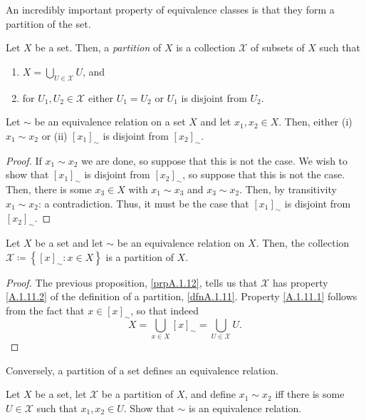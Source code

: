 An incredibly important property of equivalence classes is that they form a partition of the set.
\begin{dfn}[Partition]\label{dfnA.1.11}
Let $X$ be a set.  Then, a \emph{partition} of $X$ is a collection $\mathcal{X}$ of subsets of $X$ such that
\begin{enumerate}
\item \label{A.1.11.1}$X=\bigcup _{U\in \mathcal{X}}U$, and
\item \label{A.1.11.2}for $U_1,U_2\in \mathcal{X}$ either $U_1=U_2$ or $U_1$ is disjoint from $U_2$.
\end{enumerate}
\end{dfn}
\begin{prp}\label{prpA.1.12}
Let $\sim$ be an equivalence relation on a set $X$ and let $x_1,x_2\in X$.  Then, either (i) $x_1\sim x_2$ or (ii) $[x_1]_\sim$ is disjoint from $[x_2]_\sim$.
\begin{proof}
If $x_1\sim x_2$ we are done, so suppose that this is not the case.  We wish to show that $[x_1]_\sim$ is disjoint from $[x_2]_\sim$, so suppose that this is not the case.  Then, there is some $x_3\in X$ with $x_1\sim x_3$ and $x_3\sim x_2$.  Then, by transitivity $x_1\sim x_2$:  a contradiction.  Thus, it must be the case that $[x_1]_\sim$ is disjoint from $[x_2]_\sim$.
\end{proof}
\end{prp}
\begin{crl}
Let $X$ be a set and let $\sim$ be an equivalence relation on $X$.  Then, the collection $\mathcal{X}\coloneqq \left\{ [x]_\sim :x\in X\right\}$ is a partition of $X$.
\begin{proof}
The previous proposition, \cref{prpA.1.12}, tells us that $\mathcal{X}$ has property \cref{A.1.11.2} of the definition of a partition, \cref{dfnA.1.11}.  Property \cref{A.1.11.1} follows from the fact that $x\in [x]_\sim$, so that indeed
\begin{equation}
X=\bigcup _{x\in X}[x]_\sim =\bigcup _{U\in \mathcal{X}}U.
\end{equation}
\end{proof}
\end{crl}
Conversely, a partition of a set defines an equivalence relation.
\begin{exr}\label{exrA.1.41}
Let $X$ be a set, let $\mathcal{X}$ be a partition of $X$, and define $x_1\sim x_2$ iff there is some $U\in \mathcal{X}$ such that $x_1,x_2\in U$.  Show that $\sim$ is an equivalence relation.
\end{exr}

